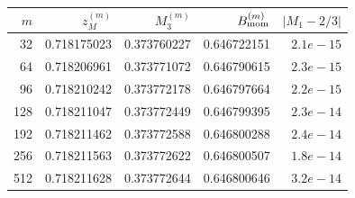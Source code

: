 \begin{tabular}{rrrrr}
\toprule
$m$ & $z_M^{(m)}$ & $M_3^{(m)}$ & $B_{\rm mom}^{(m)}$ & $|M_1-2/3|$\\
\midrule
32 & 0.718175023 & 0.373760227 & 0.646722151 & $2.1e-15$\\
64 & 0.718206961 & 0.373771072 & 0.646790615 & $2.3e-15$\\
96 & 0.718210242 & 0.373772178 & 0.646797664 & $2.2e-15$\\
128 & 0.718211047 & 0.373772449 & 0.646799395 & $2.3e-14$\\
192 & 0.718211462 & 0.373772588 & 0.646800288 & $2.4e-14$\\
256 & 0.718211563 & 0.373772622 & 0.646800507 & $1.8e-14$\\
512 & 0.718211628 & 0.373772644 & 0.646800646 & $3.2e-14$\\
\bottomrule
\end{tabular}
